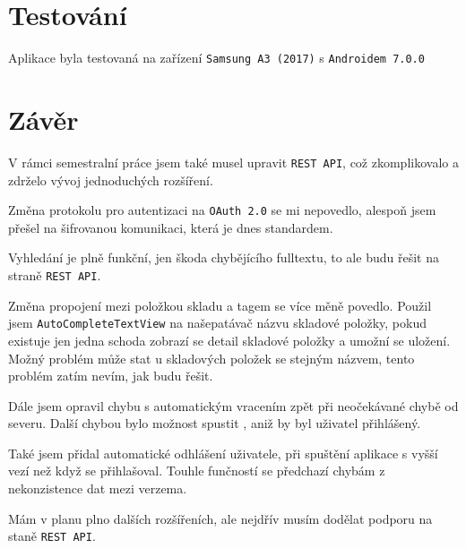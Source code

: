 \documentclass[12pt]{report}
\begin{document}
\chapter{Testování}
Aplikace byla testovaná na zařízení \texttt{Samsung A3 (2017)} s \texttt{Androidem 7.0.0} 

\chapter{Závěr}
V rámci semestralní práce jsem také musel upravit \texttt{REST API}, což zkomplikovalo a zdrželo vývoj jednoduchých rozšíření.

Změna protokolu pro autentizaci na \texttt{OAuth 2.0} se mi nepovedlo, alespoň jsem přešel na šifrovanou komunikaci, která je dnes standardem.

Vyhledání je plně funkční, jen škoda chybějícího fulltextu, to ale budu řešit na straně \texttt{REST API}.

Změna propojení mezi položkou skladu a tagem se více měně povedlo. Použil jsem \texttt{AutoCompleteTextView} na našepatávač názvu skladové položky, pokud existuje jen jedna schoda zobrazí se detail skladové položky a umožní se uložení. Možný problém může stat u skladových položek se stejným názvem, tento problém zatím nevím, jak budu řešit.

Dále jsem opravil chybu s automatickým vracením zpět při neočekávané chybě od severu.
Další chybou bylo možnost spustit , aniž by byl uživatel přihlášený.

Také jsem přidal automatické odhlášení uživatele, při spuštění aplikace s vyšší vezí než když se přihlašoval. Touhle funčností se předchazí chybám z nekonzistence dat mezi verzema. 

Mám v planu plno dalších rozšířeních, ale nejdřív musím dodělat podporu na staně \texttt{REST API}.
\end{document}
